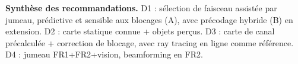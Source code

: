 \documentclass[11pt,a4paper]{article}
\begin{document}
\vspace{0.4cm}
\noindent\colorbox{tabchoice}{\parbox{\dimexpr\linewidth-2\fboxsep}{%
\textbf{Synthèse des recommandations.} D1 : sélection de faisceau assistée par jumeau, prédictive
et sensible aux blocages (A), avec précodage hybride (B) en extension. D2 : carte statique connue
+ objets perçus. D3 : carte de canal précalculée + correction de blocage, avec ray tracing en
ligne comme référence. D4 : jumeau FR1+FR2+vision, beamforming en FR2.}}
\end{document}
